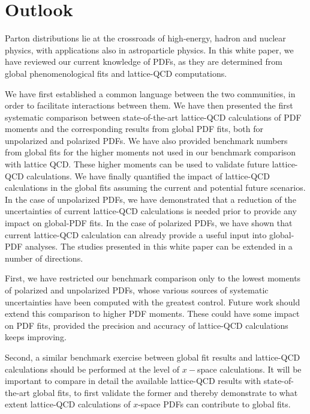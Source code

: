 \section{Outlook}
\label{sec:outlook}

Parton distributions lie at the crossroads of high-energy, 
hadron and nuclear physics, with applications also in astroparticle physics.
%
In this white paper, we have reviewed our current knowledge of PDFs, as they
are determined from global phenomenological fits and lattice-QCD computations. 

We have first established a common language
between the two communities, in order to facilitate interactions between them.
%
We have then presented the first systematic comparison between state-of-the-art 
lattice-QCD calculations of PDF moments and the corresponding results from 
global PDF fits, both for unpolarized and polarized PDFs.
%
We have also provided benchmark numbers from global fits for the higher moments 
not used in our benchmark comparison with lattice QCD. 
%
These higher moments can be used to validate future lattice-QCD calculations.
%
We have finally quantified the impact of lattice-QCD calculations in the 
global fits assuming the current and potential future scenarios.
%
In the case of unpolarized PDFs, we have demonstrated that a reduction 
of the uncertainties of current lattice-QCD calculations is needed 
prior to provide any impact on global-PDF fits.
%
In the case of polarized PDFs, we have shown that current lattice-QCD
calculation can already provide a useful input into global-PDF analyses.
%
The studies presented in this white paper can be extended in a number of 
directions.

First, we have restricted our benchmark comparison only to the lowest moments 
of polarized and unpolarized PDFs, whose various sources of systematic 
uncertainties have been computed with the greatest control.
%
Future work should extend this comparison to higher PDF moments.
%
These could have some impact on PDF fits, provided the precision and accuracy
of lattice-QCD calculations keeps improving.

Second, a similar benchmark exercise between global fit results and 
lattice-QCD calculations should be performed at the level of
$x-$space calculations.
%
It will be important to compare in detail the available lattice-QCD results 
with state-of-the-art global fits, to first validate the former and
thereby demonstrate to what extent lattice-QCD calculations of $x$-space PDFs 
can contribute to global fits.

